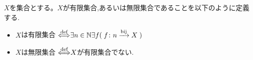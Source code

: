 \begin{definition}[p183の定義7.1.1]
	\label{definition:有限集合,無限集合の定義}
	$X$を集合とする。$X$が有限集合,あるいは無限集合であることを以下のように定義する.
	\begin{itemize}[nosep]
	 	\item $X$は有限集合$\ \mbox{$\stackrel{\text{def}}{\Longleftrightarrow}$} \exists n \in \mathbb{N}\exists f( \; f\colon n \xrightarrow{\text{bij}} X \; )$
	 	\item $X$は無限集合$\ \mbox{$\stackrel{\text{def}}{\Longleftrightarrow}$} X$が有限集合でない.
	\end{itemize}
\end{definition}
